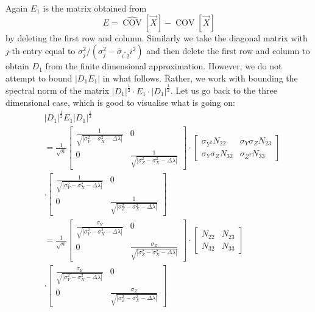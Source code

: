 \documentclass[12pt]{amsart}
\theoremstyle{definition}
\DeclareMathOperator{\Cov}{COV}
\numberwithin{equation}{section}
\numberwithin{equation}{section}
\theoremstyle{remark}
\numberwithin{equation}{section}
\begin{document}
Again $E_1$ is the matrix obtained from
$$E=\hat{\Cov}[\vec{X}]-\Cov[\vec{X}]$$
by deleting the first row and column. Similarly we take the diagonal matrix with $j$-th entry equal to $\sigma_j^2/(\sigma_{j}^2-\hat{\sigma}_{i^*2}i^2)$ and then delete the first row and column to obtain $D_1$ from the finite dimensional approximation. However, we do not attempt to bound $|D_1E_1|$ in what follows. Rather, we work with bounding the spectral norm of the matrix $|D_1|^{\frac{1}{2}}\cdot E_1\cdot |D_1|^{\frac{1}{2}}$. Let us go back to the three dimensional case, which is good to visualise what is going on:
\begin{align*}
&|D_1|^{\frac{1}{2}}E_1 |D_1|^{\frac{1}{2}}\\
&=\frac{1}{\sqrt{n}}\left[
\begin{array}{cc}
\frac{1}{\sqrt{|\sigma_Y^2-\sigma_X^2-\Delta\lambda|}}&0\\
0&\frac{1}{\sqrt{|\sigma_Z^2-\sigma_X^2-\Delta\lambda|}}
\end{array}
\right]\cdot
\left[
\begin{array}{cc}
\sigma_{Y^2}N_{22}&\sigma_Y\sigma_Z N_{23}\\
\sigma_Y\sigma_Z N_{32}&\sigma_{Z^2} N_{33}
\end{array}\right]\\
&\cdot
\left[
\begin{array}{cc}
\frac{1}{\sqrt{|\sigma_Y^2-\sigma_X^2-\Delta\lambda|}}&0\\
0&\frac{1}{\sqrt{|\sigma_Z^2-\sigma_X^2-\Delta\lambda|}}
\end{array}
\right]\\
&=
\frac{1}{\sqrt{n}}\left[
\begin{array}{cc}
\frac{\sigma_Y}{\sqrt{|\sigma_Y^2-\sigma_X^2-\Delta\lambda|}}&0\\
0&\frac{\sigma_Z}{\sqrt{|\sigma_Z^2-\sigma_X^2-\Delta\lambda|}}
\end{array}
\right]\cdot
\left[
\begin{array}{cc}
N_{22}&N_{23}\\
N_{32}& N_{33}
\end{array}\right]\\
&\cdot\left[
\begin{array}{cc}
\frac{\sigma_Y}{\sqrt{|\sigma_Y^2-\sigma_X^2-\Delta\lambda|}}&0\\
0&\frac{\sigma_Z}{\sqrt{|\sigma_Z^2-\sigma_X^2-\Delta\lambda|}}
\end{array}\right]
\end{align*}
\end{document}
